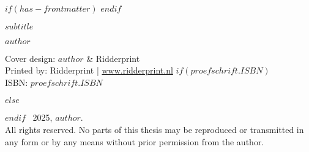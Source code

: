 
$if(has-frontmatter)$
\frontmatter
$endif$


\begin{titlepage}
  \hspace{0pt}
  \vfill
  \begin{center}
     \par %
    \smallskip
    \textsf{\Large $subtitle$} \par
    \vfill
    \textsf{\large $author$}
  \end{center}
\end{titlepage}


\clearpage
\thispagestyle{empty}
\vspace*{\fill} %

\begingroup
  \setlength{\parskip}{\baselineskip}
  \begin{flushleft}
    Cover design: $author$ \& Ridderprint \\
    Printed by: Ridderprint | \href{www.ridderprint.nl}{www.ridderprint.nl}
    $if(proefschrift.ISBN)$
    \\ ISBN: $proefschrift.ISBN$ \par
    $else$
    \par
    $endif$
    \textcopyright \ 2025, $author$. \\
    All rights reserved. No parts of this thesis may be reproduced or transmitted in any form or by any means without prior permission from the author.
  \end{flushleft}
\endgroup


\clearpage
\thispagestyle{empty}


